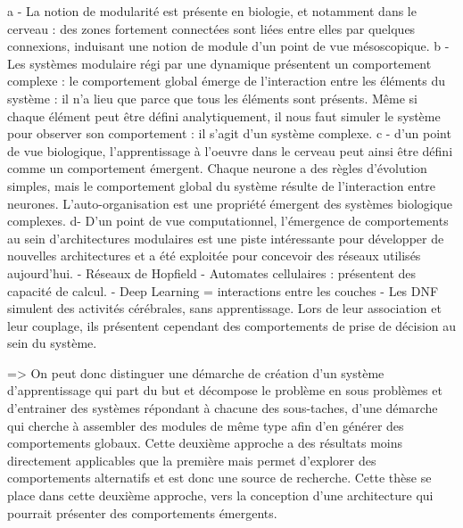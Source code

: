     a - La notion de modularité est présente en biologie, et notamment dans le cerveau : des zones fortement connectées sont liées entre elles par quelques connexions, induisant une notion de module d'un point de vue mésoscopique.
    b - Les systèmes modulaire régi par une dynamique présentent un comportement complexe : le comportement global émerge de l'interaction entre les éléments du système : il n'a lieu que parce que tous les éléments sont présents. Même si chaque élément peut être défini analytiquement, il nous faut simuler le système pour observer son comportement : il s'agit d'un système complexe.
    c -  d'un point de vue biologique, l'apprentissage à l'oeuvre dans le cerveau peut ainsi être défini comme un comportement émergent. Chaque neurone a des règles d'évolution simples, mais le comportement global du système résulte de l'interaction entre neurones.
    L'auto-organisation est une propriété émergent des systèmes biologique complexes.
    d-  D'un point de vue computationnel, l'émergence de comportements au sein d'architectures modulaires est une piste intéressante pour développer de nouvelles architectures et a été exploitée pour concevoir des réseaux utilisés aujourd'hui.
        - Réseaux de Hopfield
        - Automates cellulaires : présentent des capacité de calcul.
        - Deep Learning = interactions entre les couches 
        - Les DNF simulent des activités cérébrales, sans apprentissage. Lors de leur association et leur couplage, ils présentent cependant des comportements de prise de décision au sein du système. 

=>  On peut donc distinguer une démarche de création d'un système d'apprentissage qui part du but et décompose le problème en sous problèmes et d'entrainer des systèmes répondant à chacune des sous-taches, d'une démarche qui cherche à assembler des modules de même type afin d'en générer des comportements globaux. Cette deuxième approche a des résultats moins directement applicables que la première mais permet d'explorer des comportements alternatifs et est donc une source de recherche.
Cette thèse se place dans cette deuxième approche, vers la conception d'une architecture qui pourrait présenter des comportements émergents.

